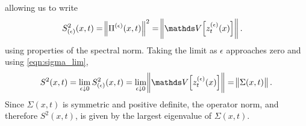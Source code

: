 allowing us to write
\begin{align*}
	S^2_{(\epsilon)}(x,t) %
	 & = \norm{\Pi^{(\epsilon)}(x,t)}^2 = \norm{\var{z_t^{(\epsilon)}(x)}}.
\end{align*}
using properties of the spectral norm.
Taking the limit as \(\epsilon\) approaches zero and using \eqref{eqn:sigma_lim},
\[
	S^2(x,t) = \lim_{\epsilon\downarrow 0} S^2_{(\epsilon)}(x,t) = \lim_{\epsilon\downarrow 0}\norm{\var{z_t^{(\epsilon)}(x)}} = \norm{\Sigma(x,t)}.
\]
Since \(\Sigma(x,t)\) is symmetric and positive definite, the operator norm, and therefore \(S^2(x,t)\), is given by the largest eigenvalue of \(\Sigma(x,t)\).

